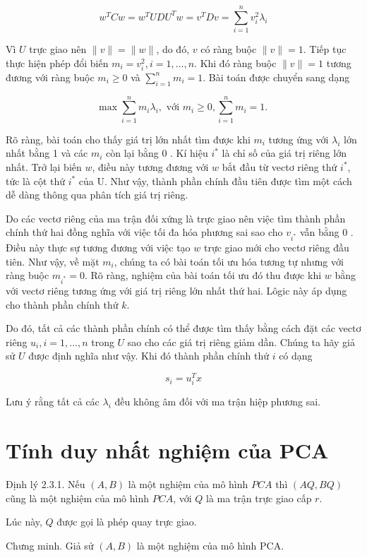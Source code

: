\documentclass[12pt,a4paper,oneside]{report}
\numberwithin{equation}{section}
\begin{document}
$$
w^{T} C w=w^{T} U D U^{T} w=v^{T} D v=\sum_{i=1}^{n} v_{i}^{2} \lambda_{i}
$$

Vì $U$ trực giao nên $\|v\|=\|w\|$, do đó, $v$ có ràng buộc $\|v\|=1$. Tiếp tục thực hiện phép đổi biến $m_{i}=v_{i}^{2}, i=1, \ldots, n$. Khi đó ràng buộc $\|v\|=1$ tương đương với ràng buộc $m_{i} \geq 0$ và $\sum_{i=1}^{n} m_{i}=1$. Bài toán được chuyển sang dạng

$$
\max \sum_{i=1}^{n} m_{i} \lambda_{i}, \text { với } m_{i} \geq 0, \sum_{i=1}^{n} m_{i}=1 \text {. }
$$

Rõ ràng, bài toán cho thấy giá trị lớn nhất tìm được khi $m_{i}$ tương ứng với $\lambda_{i}$ lớn nhất bằng 1 và các $m_{i}$ còn lại bằng 0 . Kí hiệu $i^{*}$ là chỉ số của giá trị riêng lớn nhất. Trở lại biến $w$, điều này tương đương với $w$ bắt đầu từ vectơ riêng thứ $i^{*}$, tức là cột thứ $i^{*}$ của U. Như vậy, thành phần chính đầu tiên được tìm một cách dễ dàng thông qua phân tích giá trị riêng.

Do các vectơ riêng của ma trận đối xứng là trực giao nên việc tìm thành phần chính thứ hai đồng nghĩa với việc tối đa hóa phương sai sao cho $v_{i^{*}}$ vẫn bằng 0 . Điều này thực sự tương đương với việc tạo $w$ trực giao mới cho vectơ riêng đầu tiên. Như vậy, về mặt $m_{i}$, chúng ta có bài toán tối ưu hóa tương tự nhưng với ràng buộc $m_{i^{*}}=0$. Rõ ràng, nghiệm của bài toán tối ưu đó thu được khi $w$ bằng với vectơ riêng tương ứng với giá trị riêng lớn nhất thứ hai. Lôgic này áp dụng cho thành phần chính thứ $k$.

Do đó, tất cả các thành phần chính có thể được tìm thấy bằng cách đặt các vectơ riêng $u_{i}, i=1, \ldots, n$ trong $U$ sao cho các giá trị riêng giảm dần. Chúng ta hãy giả sử $U$ được định nghĩa như vậy. Khi đó thành phần chính thứ $i$ có dạng

$$
s_{i}=u_{i}^{T} x
$$

Lưu ý rằng tất cả các $\lambda_{i}$ đều không âm đối với ma trận hiệp phương sai.

\section{Tính duy nhất nghiệm của PCA}

Định lý 2.3.1. Nếu $(A, B)$ là một nghiệm của mô hình $P C A$ thì $(A Q, B Q)$ cũng là một nghiệm của mô hình $P C A$, với $Q$ là ma trận trực giao cấp $r$.

Lúc này, $Q$ được gọi là phép quay trực giao.

Chưng minh. Giả sử $(A, B)$ là một nghiệm của mô hình $\mathrm{PCA}$.
\end{document}
